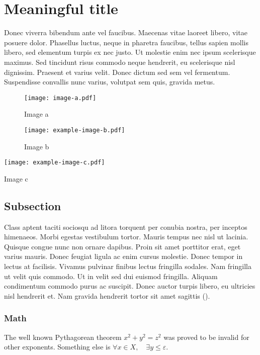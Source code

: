 \documentclass{jcls}
\begin{document}
\section{Meaningful title}

Donec viverra bibendum ante vel faucibus. Maecenas vitae laoreet libero, vitae posuere dolor. Phasellus luctus, neque in pharetra faucibus, tellus sapien mollis libero, sed elementum turpis ex nec justo. Ut molestie enim nec ipsum scelerisque maximus. Sed tincidunt risus commodo neque hendrerit, eu scelerisque nisl dignissim. Praesent et varius velit. Donec dictum sed sem vel fermentum. Suspendisse convallis nunc varius, volutpat sem quis, gravida metus.

\begin{figure}
	\texttt{[image: image-a.pdf]}
	\caption{Image a}
\end{figure}
%
%
%
%

\begin{figure*}
	\texttt{[image: example-image-b.pdf]}
	\caption{Image b}
\end{figure*}

\begin{fullwidthfigure}
	\texttt{[image: example-image-c.pdf]}
	\caption{Image c}
\end{fullwidthfigure}


\subsection{Subsection}

Class aptent taciti sociosqu ad litora torquent per conubia nostra, per inceptos himenaeos. Morbi egestas vestibulum tortor. Mauris tempus nec nisl ut lacinia. Quisque congue nunc non ornare dapibus. Proin sit amet porttitor erat, eget varius mauris. Donec feugiat ligula ac enim cursus molestie. Donec tempor in lectus at facilisis. Vivamus pulvinar finibus lectus fringilla sodales. Nam fringilla ut velit quis commodo. Ut in velit sed dui euismod fringilla. Aliquam condimentum commodo purus ac suscipit. Donec auctor turpis libero, eu ultricies nisl hendrerit et. Nam gravida hendrerit tortor sit amet sagittis (\cite{dirac}).

\subsubsection{Math}

The well known Pythagorean theorem $x^2 + y^2 = z^2$ was proved to be
invalid for other exponents. Something else is
\(\forall x \in X, \quad \exists y \leq ε\).
\end{document}
